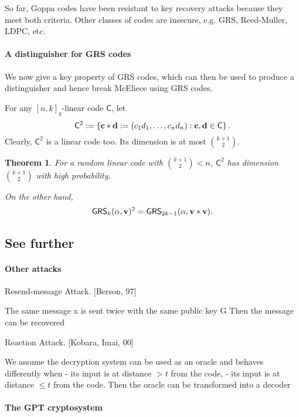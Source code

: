 \documentclass[a4paper, 11pt, openany]{book}
\numberwithin{equation}{section}
\theoremstyle{plain}
\newtheorem{theorem}	[equation]	{Theorem}
\theoremstyle{definition}
\newcommand{\code}[1]{\mathsf{#1}}
\newcommand{\GeneralizedReedSolomon}{\code{GRS}}
\begin{document}
So far, Goppa codes have been resistant to key recovery attacks because they meet both criteria. Other classes of codes are insecure, e.g. GRS, Reed-Muller, LDPC, etc.


\paragraph{A distinguisher for GRS codes}
We now give a key property of GRS codes, which can then be used to produce a distinguisher and hence break McEliece using GRS codes.

For any $[n,k]_q$-linear code $\code{C}$, let
\[
	\code{C}^2 := \left\{ {\bf c} * {\bf d} := (c_1 d_1, \dots, c_n d_n ) : {\bf c}, {\bf d} \in \code{C} \right\}.
\]
Clearly, $\code{C}^2$ is a linear code too. Its dimension is at most $\binom{k+1}{2}$.

\begin{theorem} 
For a random linear code with $\binom{k+1}{2} < n$, $\code{C}^2$ has dimension $\binom{k+1}{2}$ with high probability.

On the other hand, 
\[
    \GeneralizedReedSolomon_k({\bf \alpha}, {\bf v} )^2 = \GeneralizedReedSolomon_{2k-1}({\bf \alpha}, {\bf v} * {\bf v}).
\]
\end{theorem}




\subsection{See further}




\paragraph{Other attacks}

Resend-message Attack. [Berson, 97]

The same message x is sent twice with the same public key G
Then the message can be recovered

Reaction Attack. [Kobara, Imai, 00]

We assume the decryption system can be used as an oracle and
behaves differently when
- its input is at distance $> t$ from the code,
- its input is at distance $\le t$ from the code.
Then the oracle can be transformed into a decoder

\paragraph{The GPT cryptosystem}
\end{document}
